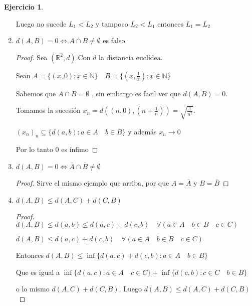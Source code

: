 \documentclass[12pt]{article}
\newcommand{\R}{\mathbb{R}}
\newcommand{\N}{\mathbb{N}}
\newcommand{\ra}{\rightarrow}
\newcommand{\ol}{\overline}
\theoremstyle{definition}
\newtheorem{ej}{Ejercicio}
\begin{document}
\begin{ej}
\begin{enumerate}
Luego no sucede $L_1 < L_2 $ y tampoco $L_2 < L_1$ entonces $L_1 = L_2$
    \item $d(A,B) = 0 \iff A \cap B \neq \emptyset$ es falso
      \begin{proof}
	Sea $(\R^2,d)$.Con $d$ la distancia euclídea. 

	Sean $A = \{(x,0): x \in \N\} \quad B= \{(x,\frac{1}{x}): x \in \N \}$ 

	Sabemos que $A \cap B = \emptyset$ , sin embargo es facil ver que $d(A,B) = 0$. 

	Tomamos la sucesión $x_n = d((n,0), (n + \frac{1}{n})) = \sqrt{\frac{1}{n^2}}$. 
	
	$(x_n)_n \subseteq \{d(a,b) : a\in A \quad b \in B\}$ y además $x_n \ra 0$

	Por lo tanto $0$ es ínfimo

      \end{proof}
    \item $d(A,B) = 0 \iff \ol A \cap \ol B \neq \emptyset$
      \begin{proof}
	Sirve el mismo ejemplo que arriba, por que $A = \ol A$ y $B = \ol B$
      \end{proof}
    \item $d(A,B) \leq d(A,C) + d(C,B)$
      \begin{proof}
	$d(A,B)  \leq d(a,b) \leq d(a,c) + d(c,b) \quad \forall (a \in A \quad b \in B \quad c \in C)$

      $d(A,B) \leq d(a,c) + d(c,b) \quad \forall (a \in A \quad b \in B \quad c \in C)$ 

      Entonces $d(A,B) \leq \inf \{d(a,c) + d(c,b) : a \in A \quad b \in B\}$

      Que es igual a  $ \inf \{d(a,c) :  a \in A \quad c \in C\} + \inf \{d(c,b): c \in C \quad b \in B\}$

      o lo mismo $d(A,C) + d(C,B)$. Luego $d(A,B) \leq d(A,C) + d(C,B)$
      \end{proof}
  \end{enumerate}
\end{ej}
\end{document}
